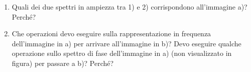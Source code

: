 \documentclass[a4paper]{article}
\begin{document}
	\begin{enumerate}[label=\Roman*]
		\item Quali dei due spettri in ampiezza tra 1) e 2) corrispondono all'immagine a)? Perché?
		
		\item Che operazioni devo eseguire sulla rappresentazione in frequenza dell'immagine in a) per arrivare all'immagine in b)? Devo eseguire qualche operazione sullo spettro di fase dell'immagine in a) (non visualizzato in figura) per passare a b)? Perché?
	\end{enumerate}
\end{document}
